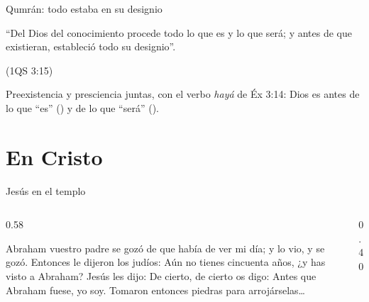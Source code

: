 \begin{frame}{Qumrán: todo estaba en su designio}
\begin{center}\large{}\end{center}
\begin{tcolorbox}[colback=papiro,colframe=dorado,boxrule=1pt,arc=3pt]
\centering\small ``Del Dios del conocimiento procede todo lo que es y lo que será; y antes de que existieran, estableció todo su designio''.\par{\scriptsize\color{gris}(1QS 3:15)}
\end{tcolorbox}
\small Preexistencia y presciencia juntas, con el verbo \emph{hayá} de Éx 3:14: Dios es antes de lo que ``es'' () y de lo que ``será'' ().\par\medskip
{}
\end{frame}

\section{En Cristo}

\begin{frame}{Jesús en el templo}
\begin{columns}[c,onlytextwidth]
\begin{column}{0.58\textwidth}
\begin{cita}Abraham vuestro padre se gozó de que había de ver mi día; y lo vio, y se gozó. Entonces le dijeron los judíos: Aún no tienes cincuenta años, ¿y has visto a Abraham? Jesús les dijo: De cierto, de cierto os digo: Antes que Abraham fuese, yo soy. Tomaron entonces piedras para arrojárselas\ldots{}\end{cita}
\end{column}
\begin{column}{0.40\textwidth}\end{column}
\end{columns}
\end{frame}

